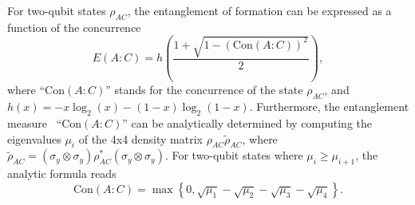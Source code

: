 \documentclass[aps,prl,showpacs,amsmath,amssymb,amsfonts,lengthcheck,onecolumn,longbibliography,superscriptaddress]{revtex4-2}
\newcommand{\+}         {\dagger}
\begin{document}
For two-qubit states $\rho_{AC}$, the entanglement of formation can be expressed as a function of the concurrence~\cite{wootters2001entanglement}
\begin{equation}
	E\left(A:C\right)=h\left(\frac{1+\sqrt{1-\left(\mathrm{Con}\left(A:C\right)\right)^{2}}}{2}\right),
\end{equation}
where ``$\mathrm{Con}\left(A:C\right)$'' stands for the concurrence of the state $\rho_{A C}$, and ${h}(x)=-x \log_2(x)-(1-x) \log_2(1-x)$. Furthermore, the entanglement measure~\cite{emeasure,wootters2001entanglement} ``$\mathrm{Con}\left(A:C\right)$'' can be analytically determined by computing the eigenvalues $\mu_i$ of the 4x4 density matrix $\rho_{AC}\tilde{\rho}_{AC}$, where $\tilde{\rho}_{AC}=\left(\sigma_y \otimes \sigma_y \right)  \rho^{*}_{AC} \left(\sigma_y \otimes \sigma_y \right)$. For two-qubit states where $\mu_i \geq \mu_{i+1}$, the analytic formula reads~\cite{concurrence2}
\begin{equation}
	\mathrm{Con}(A:C)=\max \left\{0, \sqrt{\mu_{1}}-\sqrt{\mu_{2}}-\sqrt{\mu_{3}}-\sqrt{\mu_{4}}\right\}.
	\label{con1}
\end{equation}
\end{document}
